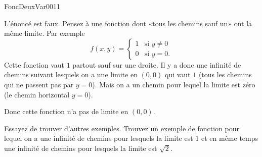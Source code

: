 

\begin{corrige}{FoncDeuxVar0011}

	L'énoncé est faux. Pensez à une fonction dont «tous les chemins sauf un» ont la même limite. Par exemple
	\begin{equation}
		f(x,y)=\begin{cases}
			1	&	\text{si $y\neq 0$}\\
			0	&	 \text{si $y=0$.}
		\end{cases}
	\end{equation}
	Cette fonction vaut $1$ partout sauf sur une droite. Il y a donc une infinité de chemins suivant lesquels on a une limite en $(0,0)$ qui vaut $1$ (tous les chemins qui ne passent pas par $y=0$). Mais on a un chemin pour lequel la limite est zéro (le chemin horizontal $y=0$).

	Donc cette fonction n'a pas de limite en $(0,0)$.

	Essayez de trouver d'autres exemples. Trouvez un exemple de fonction pour lequel on a une infinité de chemins pour lesquels la limite est $1$ et en même temps une infinité de chemins pour lesquels la limite est $\sqrt{2}$.

\end{corrige}
